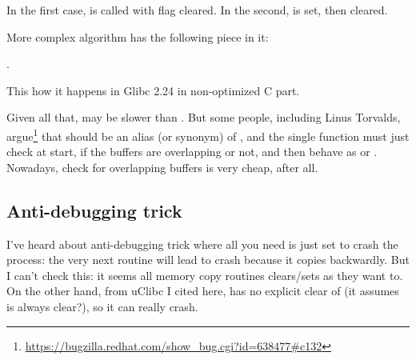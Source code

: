 In the first case,  is called with  flag cleared.
In the second,  is set, then cleared.

More complex algorithm has the following piece in it:

.

This how it happens in Glibc 2.24 in non-optimized C part.

Given all that,  may be slower than .
But some people, including Linus Torvalds, argue\footnote{\url{https://bugzilla.redhat.com/show_bug.cgi?id=638477\#c132}}
that  should be an alias (or synonym) of , and the single
function must just check at start, if the buffers are overlapping or not, and then behave as  or .
Nowadays, check for overlapping buffers is very cheap, after all.

\subsection{Anti-debugging trick}

I've heard about anti-debugging trick where all you need is just set  to crash the process: the very next 
routine will lead to crash because it copies backwardly.
But I can't check this: it seems all memory copy routines clears/sets  as they want to.
On the other hand,  from uClibc I cited here,
has no explicit clear of  (it assumes  is always clear?),
so it can really crash.


